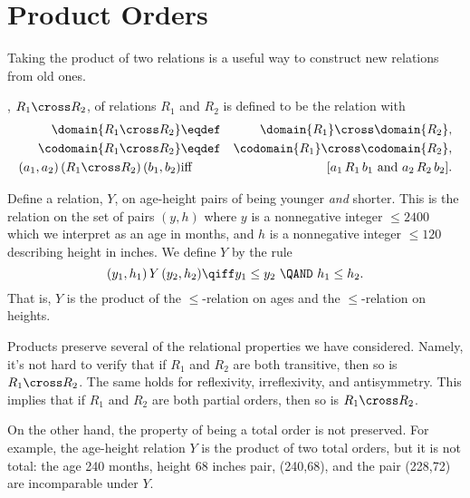 \section{Product Orders}\label{prodsec}

Taking the product of two relations is a useful way to construct new
relations from old ones.

\begin{definition}\label{productrel}
, $R_1 \cross R_2$, of relations
$R_1$ and $R_2$ is defined to be the relation with
\begin{eqnarray*}
\domain{R_1 \cross R_2} &\eqdef& \domain{R_1} \cross \domain{R_2},\\
\codomain{R_1 \cross R_2} &\eqdef& \codomain{R_1} \cross \codomain{R_2},\\
(a_1,a_2)\, (R_1 \cross R_2)\, (b_1,b_2) &\text{iff}& [a_1\, R_1\, b_1
\text{ and } a_2\, R_2\, b_2].
\end{eqnarray*}

\end{definition}

\begin{example}\label{Y}
Define a relation, $Y$, on age-height pairs of being younger \emph{and}
shorter.  This is the relation on the set of pairs $(y,h)$ where $y$ is a
nonnegative integer $\le 2400$ which we interpret as an age in months, and $h$
is a nonnegative integer $\le 120$ describing height in inches.  We define $Y$
by the rule
\[
(y_1,h_1)\, Y\, (y_2,h_2) \qiff y_1 \le y_2\ \QAND\ h_1 \le h_2.
\]
That is, $Y$ is the product of the $\le$-relation on ages and the
$\le$-relation on heights.
\end{example}

Products preserve several of the relational properties we have considered.
Namely, it's not hard to verify that if $R_1$ and $R_2$ are both
transitive, then so is $R_1 \cross R_2$.  The same holds for reflexivity,
irreflexivity, and antisymmetry.  This implies that if $R_1$ and $R_2$ are
both partial orders, then so is $R_1 \cross R_2$.

On the other hand, the property of being a total order is not preserved.
For example, the age-height relation $Y$ is the product of two total
orders, but it is not total: the age 240 months, height 68 inches pair,
(240,68), and the pair (228,72) are incomparable under $Y$.

\begin{problems}
\classproblems
{}
\end{problems}

